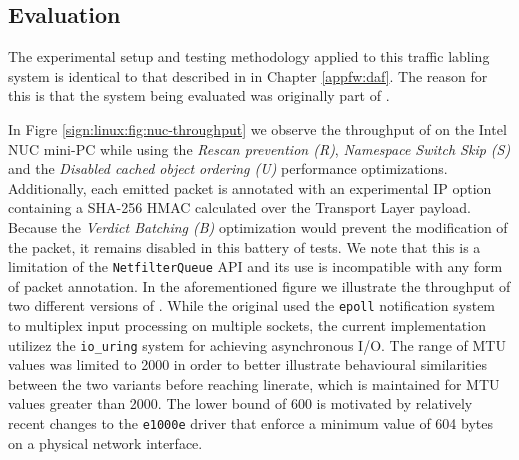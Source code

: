 \subsection{Evaluation}
\label{sign:linux:evaluation}

The experimental setup and testing methodology applied to this traffic labling system is identical to that described in in Chapter \ref{appfw:daf}. The reason for this is that the system being evaluated was originally part of \daf{}.



In Figre \ref{sign:linux:fig:nuc-throughput} we observe the throughput of \daf{} on the Intel NUC mini-PC while using the \textit{Rescan prevention (R)}, \textit{Namespace Switch Skip (S)} and the \textit{Disabled cached object ordering (U)} performance optimizations. Additionally, each emitted packet is annotated with an experimental IP option containing a SHA-256 HMAC calculated over the Transport Layer payload. Because the \textit{Verdict Batching (B)} optimization would prevent the modification of the packet, it remains disabled in this battery of tests. We note that this is a limitation of the \texttt{NetfilterQueue} API and its use is incompatible with any form of packet annotation. In the aforementioned figure we illustrate the throughput of two different versions of \daf{}. While the original used the \texttt{epoll} notification system to multiplex input processing on multiple sockets, the current implementation utilizez the \texttt{io\_uring} system for achieving asynchronous I/O. The range of MTU values was limited to 2000 in order to better illustrate behavioural similarities between the two variants before reaching linerate, which is maintained for MTU values greater than 2000. The lower bound of 600 is motivated by relatively recent changes to the \texttt{e1000e} driver that enforce a minimum value of 604 bytes on a physical network interface.



